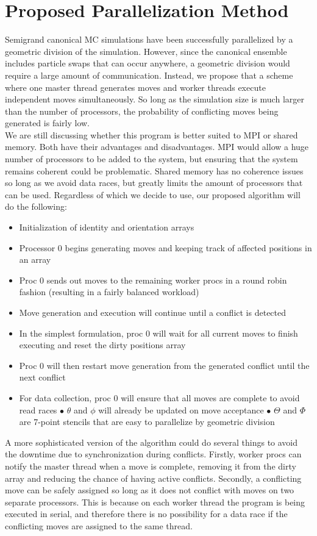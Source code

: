 \documentclass{article}
\begin{document}
\section*{Proposed Parallelization Method}
\vspace{-7pt}
\indent\indent Semigrand canonical MC simulations have been successfully parallelized by a geometric division of the simulation. However, since the canonical ensemble includes particle swaps that can occur anywhere, a geometric division would require a large amount of communication. Instead, we propose that a scheme where one master thread generates moves and worker threads execute independent moves simultaneously. So long as the simulation size is much larger than the number of processors, the probability of conflicting moves being generated is fairly low.\\
\indent We are still discussing whether this program is better suited to MPI or shared memory. Both have their advantages and disadvantages. MPI would allow a huge number of processors to be added to the system, but ensuring that the system remains coherent could be problematic. Shared memory has no coherence issues so long as we avoid data races, but greatly limits the amount of processors that can be used. Regardless of which we decide to use, our proposed algorithm will do the following:
\begin{itemize}
\item Initialization of identity and orientation arrays
\item Processor 0 begins generating moves and keeping track of affected positions in an array
\item Proc 0 sends out moves to the remaining worker procs in a round robin fashion (resulting in a fairly balanced workload)
\item Move generation and execution will continue until a conflict is detected
\item In the simplest formulation, proc 0 will wait for all current moves to finish executing and reset the dirty positions array
\item Proc 0 will then restart move generation from the generated conflict until the next conflict
\item For data collection, proc 0 will ensure that all moves are complete to avoid read races
\subitem $\bullet$ $\theta$ and $\phi$ will already be updated on move acceptance
\subitem $\bullet$ $\Theta$ and $\Phi$ are 7-point stencils that are easy to parallelize by geometric division
\end{itemize}
\indent\indent A more sophisticated version of the algorithm could do several things to avoid the downtime due to synchronization during conflicts. Firstly, worker procs can notify the master thread when a move is complete, removing it from the dirty array and reducing the chance of having active conflicts. Secondly, a conflicting move can be safely assigned so long as it does not conflict with moves on two separate processors. This is because on each worker thread the program is being executed in serial, and therefore there is no possibility for a data race if the conflicting moves are assigned to the same thread.
\end{document}
